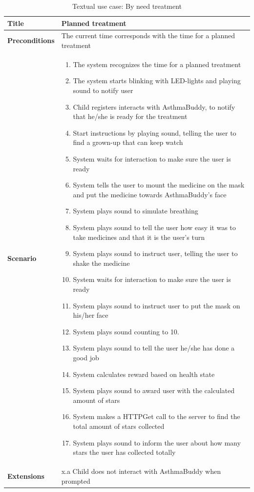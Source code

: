 \begin{table}[H]
\begin{tabular}{|p{4.0cm} | p{9.0cm} |}
\hline
\textbf{Title} & Planned treatment \\
\hline
\textbf{Preconditions} & The current time corresponds with the time for a planned treatment \\
\hline 
\textbf{Scenario} & 
	\begin{enumerate}
	  \itemsep0em
	  \item The system recognizes the time for a planned treatment
	  \item The system starts blinking with LED-lights and playing sound to notify user
	  \item Child registers interacts with AsthmaBuddy, to notify that he/she is ready for the treatment
	  \item Start instructions by playing sound, telling the user to find a grown-up that can keep watch
	  \item System waits for interaction to make sure the user is ready
	  \item System tells the user to mount the medicine on the mask and put the medicine towards AsthmaBuddy's face
	  \item System plays sound to simulate breathing
	  \item System plays sound to tell the user how easy it was to take medicines and that it is the user's turn
	  \item System plays sound to instruct user, telling the user to shake the medicine
	  \item System waits for interaction to make sure the user is ready
	  \item System plays sound to instruct user to put the mask on his/her face
	  \item System plays sound counting to 10. 
	  \item System plays sound to tell the user he/she has done a good job
	  \item System calculates reward based on health state
	  \item System plays sound to award user with the calculated amount of stars
	  \item System makes a HTTPGet call to the server to find the total amount of stars collected
	  \item System plays sound to inform the user about how many stars the user has collected totally
	\end{enumerate}
\\
\hline
	\textbf{Extensions} & 
		x.a Child does not interact with AsthmaBuddy when prompted
\\
\hline
\end{tabular}
\caption{Textual use case: By need treatment}
\label{tab:textual-use-case}
\end{table} 


